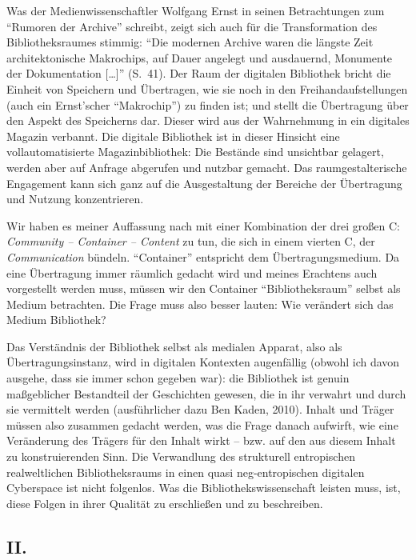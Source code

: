 \documentclass[output=paper]{langscibook}
\begin{document}
Was der Medienwissenschaftler Wolfgang Ernst in seinen Betrachtungen zum
\enquote{Rumoren der Archive} schreibt, zeigt sich auch für die
Transformation des Bibliotheksraumes stimmig: \enquote{Die modernen
Archive waren die längste Zeit architektonische Makrochips, auf Dauer
angelegt und ausdauernd, Monumente der Dokumentation {[}\ldots{]}} (S.~41). Der Raum der digitalen Bibliothek bricht die Einheit von Speichern
und Übertragen, wie sie noch in den Freihandaufstellungen (auch ein
Ernst'scher \enquote{Makrochip}) zu finden ist; und stellt die
Übertragung über den Aspekt des Speicherns dar. Dieser wird aus der
Wahrnehmung in ein digitales Magazin verbannt. Die digitale Bibliothek
ist in dieser Hinsicht eine vollautomatisierte Magazinbibliothek: Die
Bestände sind unsichtbar gelagert, werden aber auf Anfrage abgerufen und
nutzbar gemacht. Das raumgestalterische Engagement kann sich ganz auf
die Ausgestaltung der Bereiche der Übertragung und Nutzung
konzentrieren.

Wir haben es meiner Auffassung nach mit einer Kombination der drei
großen C: \emph{Community -- Container -- Content} zu tun, die sich in
einem vierten C, der \emph{Communication} bündeln. \enquote{Container}
entspricht dem Übertragungsmedium. Da eine Übertragung immer räumlich
gedacht wird und meines Erachtens auch vorgestellt werden muss, müssen
wir den Container \enquote{Bibliotheksraum} selbst als Medium
betrachten. Die Frage muss also besser lauten: Wie verändert sich das
Medium Bibliothek?

Das Verständnis der Bibliothek selbst als medialen Apparat, also als
Übertragungsinstanz, wird in digitalen Kontexten augenfällig (obwohl ich
davon ausgehe, dass sie immer schon gegeben war): die Bibliothek ist
genuin maßgeblicher Bestandteil der Geschichten gewesen, die in ihr
verwahrt und durch sie vermittelt werden (ausführlicher dazu Ben Kaden,
2010). Inhalt und Träger müssen also zusammen gedacht werden, was die
Frage danach aufwirft, wie eine Veränderung des Trägers für den Inhalt
wirkt -- bzw. auf den aus diesem Inhalt zu konstruierenden Sinn. Die
Verwandlung des strukturell entropischen realweltlichen Bibliotheksraums
in einen quasi neg-entropischen digitalen Cyberspace ist nicht
folgenlos. Was die Bibliothekswissenschaft leisten muss, ist, diese
Folgen in ihrer Qualität zu erschließen und zu beschreiben.

\hypertarget{ii.}{%
\subsection*{II.}\label{ii.}}
\end{document}
